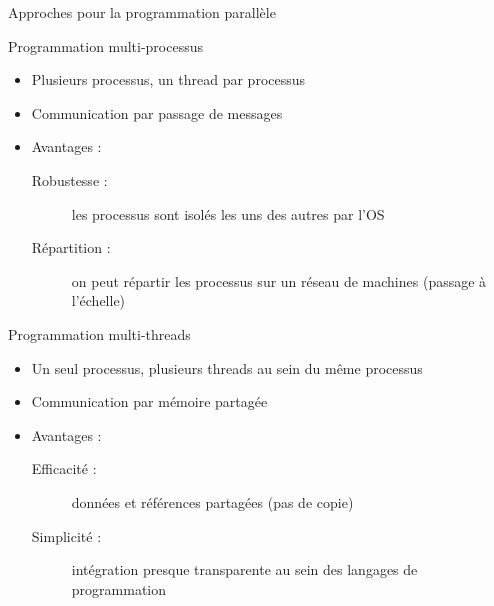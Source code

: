 
\begingroup

\begin{frame} {Approches pour la programmation parallèle}
  \begin{exampleblock}{Programmation multi-processus}
    \begin{itemize}
    \item Plusieurs processus, un thread par processus
    \item Communication par passage de messages
    \item Avantages : 
      \begin{description}
      \item [Robustesse :] les processus sont isolés les uns des autres par l'OS
      \item [Répartition :] on peut répartir les processus sur un réseau de machines (passage à l'échelle)
      \end{description}
    \end{itemize}
  \end{exampleblock}
  
  \vfill
  \begin{exampleblock}{Programmation multi-threads}
    \begin{itemize}
    \item Un seul processus, plusieurs threads au sein du même processus
    \item Communication par mémoire partagée
    \item Avantages : 
      \begin{description}
      \item [Efficacité :] données et références partagées (pas de copie) %
      \item [Simplicité :] intégration presque transparente au sein des langages de programmation %
      \end{description}
    \end{itemize}
  \end{exampleblock}
\end{frame}

\endgroup
\endinput
